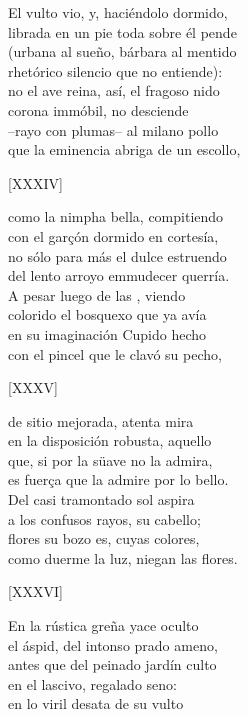 \documentclass[11pt,a4paper,twoside]{article}
\begin{document}
El vulto vio, y, haciéndolo dormido,\\
librada en un pie toda sobre él pende\\
(urbana al sueño, bárbara al mentido\\
rhetórico silencio que no entiende):\\
no el ave reina, así, el fragoso nido\\
corona immóbil,  no desciende\\
--rayo con plumas-- al milano pollo\\
que la eminencia abriga de un escollo,\pend
\begin{center}
	[XXXIV]
\end{center}\pstart
como la nimpha bella, compitiendo\\
con el garçón dormido en cortesía,\\
no sólo para más el dulce estruendo\\
del lento arroyo emmudecer querría.\\
A pesar luego de las , viendo\\ colorido el bosquexo que ya avía\\
en su imaginación Cupido hecho\\
con el pincel que le clavó su pecho,\pend
\begin{center}
	[XXXV]
\end{center}\pstart
de sitio mejorada, atenta mira\\
en la disposición robusta, aquello\\
que, si por la süave no la admira,\\
es fuerça que la admire por lo bello.\\
Del casi tramontado sol aspira\\
a los confusos rayos, su cabello;\\
flores su bozo es, cuyas colores,\\
como duerme la luz, niegan las flores.\pend
\begin{center}
	[XXXVI]
\end{center}\pstart
En la rústica greña yace oculto\\
el áspid, del intonso prado ameno,\\
antes que del peinado jardín culto\\
en el lascivo, regalado seno:\\
en lo viril desata de su vulto\\
\end{document}
